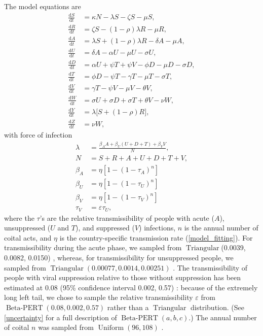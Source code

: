 \documentclass{article}
\newcommand{\md}{\mathrm{d}}
\DeclareMathOperator{\Uniform}{Uniform}
\DeclareMathOperator{\Triangular}{Triangular}
\DeclareMathOperator{\BetaPERT}{Beta-PERT}
\begin{document}
The model equations are
\begin{equation}
  \label{model_eqns}
  \begin{split}
    \frac{\md S}{\md t} &= \kappa N - \lambda S - \zeta S- \mu S,
    \\
    \frac{\md R}{\md t} & = \zeta S - (1 - \rho) \lambda R - \mu R,
    \\
    \frac{\md A}{\md t} &= \lambda S + (1 - \rho) \lambda R - \delta A - \mu A,
    \\
    \frac{\md U}{\md t} &= \delta A - \alpha U - \mu U - \sigma U,
    \\
    \frac{\md D}{\md t} &=  \alpha U + \psi T + \psi V
    - \phi D - \mu D - \sigma D,
    \\
    \frac{\md T}{\md t} &= \phi D - \psi T - \gamma T - \mu T
    - \sigma T,
    \\
    \frac{\md V}{\md t} &= \gamma T - \psi V - \mu V - \theta V,
    \\
    \frac{\md W}{\md t} &= \sigma U + \sigma D + \sigma T + \theta V -
    \nu W,
    \\
    \frac{\md Y}{\md t} &= \lambda \big[S + (1 - \rho) R\big],
    \\
    \frac{\md Z}{\md t} &= \nu W,
  \end{split}
\end{equation}
with force of infection
\begin{equation}
  \label{force_of_infection}
  \begin{split}
    \lambda &= \frac{\beta_A A + \beta_U (U + D + T) + \beta_V V}{N},
    \\
    N &= S + R +  A + U + D + T + V,
    \\
    \beta_A &= \eta \left[1 - (1 - \tau_A)^n\right]
    \\
    \beta_U &= \eta \left[1 - (1 - \tau_U)^n\right]
    \\
    \beta_V &= \eta \left[1 - (1 - \tau_V)^n\right]
    \\
    \tau_V &= \varepsilon \tau_U,
  \end{split}
\end{equation}
where the $\tau$'s are the relative transmissibility of people with
acute ($A$), unsuppressed ($U$ and $T$), and suppressed ($V$)
infections, $n$ is the annual number of coital acts, and $\eta$ is the
country-specific transmission rate (\autoref{model_fitting}).  For
transmissibility during the acute phase, we sampled from
$\Triangular$(0.0039, 0.0082, 0.0150)
\cite{Skarbinski2015-ni,Wawer2005-us}, whereas, for transmissibility
for unsuppressed people, we sampled from
$\Triangular(0.00077, 0.0014, 0.00251)$ \cite{Hughes2012-so}.  The
transmissibility of people with viral suppression relative to those
without suppression has been estimated at 0.08 (95\% confidence
interval 0.002, 0.57) \cite{Donnell2010-xo}: because of the extremely
long left tail, we chose to sample the relative transmissibility
$\varepsilon$ from $\BetaPERT(0.08, 0.002, 0.57)$ rather than a
$\Triangular$ distribution.  (See \autoref{uncertainty} for a full
description of $\BetaPERT(a, b, c)$.)  The annual number of coital $n$
was sampled from $\Uniform(96, 108)$
\cite{Wawer2005-us,Abdool_Karim2010-cm}.
\end{document}
